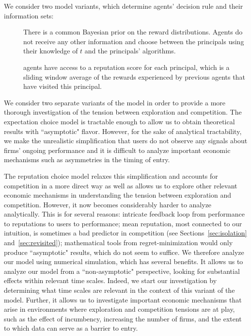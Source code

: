 We consider two model variants, which determine agents' decision rule and their information sets: 

\begin{description}
\item[\TheoryModel] 
There is a common Bayesian prior on the reward distributions.
Agents do not receive any other information and choose between the principals using their knowledge of $t$ and the principals' algorithms.
\item[\ExptsModel] agents have access to a reputation score for each principal, which is a sliding window average of the rewards experienced by previous agents that have visited this principal.
\end{description}


We consider two separate variants of the model in order to provide a more thorough investigation of the tension between exploration and competition. The expectation choice model is tractable enough to allow us to obtain theoretical results with ``asymptotic" flavor. However, for the sake of analytical tractability, we make the unrealistic simplification that users do not observe any signals about firms' ongoing performance and it is difficult to analyze important economic mechanisms such as asymmetries in the timing of entry.

The reputation choice model relaxes this simplification and accounts for competition in a more direct way as well as allows us to explore other relevant economic mechanisms in understanding the tension between exploration and competition. However, it now becomes considerably harder to analyze analytically. This is for several reasons: intricate feedback loop from performance to reputations to users to performance;
%
mean reputation, most connected to our intuition, is sometimes a bad predictor in competition (see Sections~\ref{sec:isolation} and~\ref{sec:revisited});
%
mathematical tools from regret-minimization would only produce ``asymptotic" results, which do not seem to suffice. We therefore analyze our model using numerical simulation, which has several benefits. It allows us to analyze our model from a ``non-asymptotic" perspective, looking for substantial effects within relevant time scales. Indeed, we start our investigation by determining what time scales are relevant in the context of this variant of the model. Further, it allows us to investigate important economic mechanisms that arise in environments where exploration and competition tensions are at play, such as the effect of incumbency, increasing the number of firms, and the extent to which data can serve as a barrier to entry.

